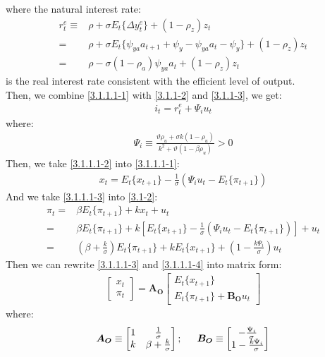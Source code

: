 \documentclass{article}
\numberwithin{equation}{section}
\begin{document}
where the natural interest rate:
	\begin{align*}
		r^e_t \equiv &\rho + \sigma E_t\{ \Delta y^e_t \} + (1 - \rho_z)z_t\\
		= &\rho + \sigma E_t\{ \psi_{ya}a_{t+1} + \psi_y - \psi_{ya} a_t - \psi_y \} + (1 - \rho_z)z_t\\
		= &\rho - \sigma(1 - \rho_a)\psi_{ya} a_t + (1 - \rho_z)z_t
	\end{align*} 
is the real interest rate consistent with the efficient level of output.\\
Then, we combine \eqref{3.1.1.1-1} with \eqref{3.1.1-2} and \eqref{3.1.1-3}, we get:
	\begin{align}
		i_t = r^e_t + \Psi_i u_t \label{3.1.1.1-2}
	\end{align}
where:
	\begin{align*}
		\Psi_i \equiv \frac{\vartheta\rho_u + \sigma k(1 - \rho_u)}{k^2 + \vartheta(1 - \beta\rho_u)} > 0
	\end{align*}
Then, we take \eqref{3.1.1.1-2} into \eqref{3.1.1.1-1}:
	\begin{align}
		x_t = E_t\{ x_{t+1} \} - \frac{1}{\sigma}(\Psi_i u_t - E_t\{ \pi_{t+1} \}) \label{3.1.1.1-3}
	\end{align}
And we take \eqref{3.1.1.1-3} into \eqref{3.1-2}:
	\begin{align}
		\pi_t = &\beta E_t\{ \pi_{t+1} \} + kx_t + u_t \nonumber\\
		= &\beta E_t\{ \pi_{t+1} \} + k \left[ E_t\{ x_{t+1} \} - \frac{1}{\sigma}(\Psi_i u_t - E_t\{ \pi_{t+1} \}) \right] + u_t \nonumber\\
		= &\left( \beta + \frac{k}{\sigma} \right)E_t\{ \pi_{t+1} \} + kE_t\{ x_{t+1} \} + \left( 1 - \frac{k\Psi_i}{\sigma} \right)u_t \label{3.1.1.1-4}
	\end{align}
Then we can rewrite \eqref{3.1.1.1-3} and \eqref{3.1.1.1-4} into matrix form:
	\begin{align}
		\begin{bmatrix}
			x_t\\
			\pi_t
		\end{bmatrix} = \boldsymbol{A_O}
		\begin{bmatrix}
			E_t\{ x_{t+1} \}\\
			E_t\{ \pi_{t+1} \} + \boldsymbol{B_O}u_t \label{3.1.1.1-5}
		\end{bmatrix}
	\end{align}
where:
	\begin{align*}
		\boldsymbol{A_O} \equiv \begin{bmatrix}
									1 & \frac{1}{\sigma}\\
									k & \beta+ \frac{k}{\sigma}
								\end{bmatrix}; \indent
		\boldsymbol{B_O} \equiv \begin{bmatrix}
									-\frac{\Psi_i}{\sigma}\\
									1 - \frac{k\Psi_i}{\sigma}
								\end{bmatrix}
	\end{align*}
\end{document}
